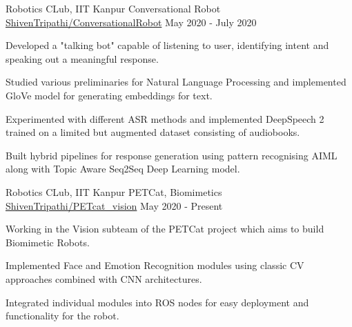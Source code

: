 \begin{cventries}
  \cventry
    {Robotics CLub, IIT Kanpur}
    {Conversational Robot}
    {\selectfont \href{https://github.com/ShivenTripathi/ConversationalRobot}{ShivenTripathi/ConversationalRobot}}
    {May 2020 - July 2020}
    {
      Developed a "talking bot" capable of listening to user, identifying intent and speaking out a meaningful response.
      \begin{cvitems}
        \item {Studied various preliminaries for Natural Language Processing and implemented GloVe model for generating embeddings for text.}
        \item {Experimented with different ASR methods and implemented DeepSpeech 2 trained on a limited but augmented dataset consisting of audiobooks.}
        \item {Built hybrid pipelines for response generation using pattern recognising AIML along with Topic Aware Seq2Seq Deep Learning model.}
      \end{cvitems}
    }

    \cventry
    {Robotics CLub, IIT Kanpur}
    {PETCat, Biomimetics}
    {\selectfont \href{https://github.com/ShivenTripathi/PETcat_vision}{ShivenTripathi/PETcat\_vision}}
    {May 2020 - Present}
    {
      \begin{cvitems}
        \item {Working in the Vision subteam of the PETCat project which aims to build Biomimetic Robots.}
        \item {Implemented Face and Emotion Recognition modules using classic CV approaches combined with CNN architectures.}
        \item {Integrated individual modules into ROS nodes for easy deployment and functionality for the robot.}
      \end{cvitems}
    }

\end{cventries}
\vspace{-2mm}